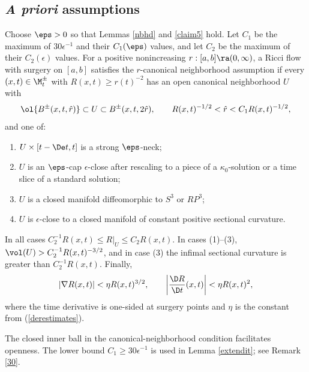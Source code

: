 \subsection{\emph{A priori} assumptions}

\begin{definition}
  \label{def:kl-priori-assumptions-canonical-neighborhood-assumption}
\label{canonicalnbhddef}
Choose $\eps>0$ so that Lemmas \ref{nbhd} and \ref{claim5} hold. Let
$C_1$ be the maximum of $30\epsilon^{-1}$ and their $C_1(\eps)$ values, and
let $C_2$ be the maximum of their $C_2(\epsilon)$ values. For a positive
nonincreasing $r:[a,b]\ra(0,\infty)$, a Ricci flow with surgery on $[a,b]$
satisfies the $r$-canonical neighborhood assumption if every
$(x,t)\in\M_t^\pm$ with $R(x,t)\geq r(t)^{-2}$ has an open canonical
neighborhood $U$ with
\[
\ol{B^\pm(x,t,\hat r)}\subset U\subset B^\pm(x,t,2\hat r),\qquad
R(x,t)^{-1/2}<\hat r<C_1R(x,t)^{-1/2},
\]
and one of:
\begin{enumerate}
\item $U\times[t-\De t,t]$ is a strong $\eps$-neck;
\item $U$ is an $\eps$-cap $\epsilon$-close after rescaling to a piece of a
$\kappa_0$-solution or a time slice of a standard solution;
\item $U$ is a closed manifold diffeomorphic to $S^3$ or $RP^3$;
\item $U$ is $\epsilon$-close to a closed manifold of constant positive
sectional curvature.
\end{enumerate}
In all cases $C_2^{-1}R(x,t)\leq R|_U\leq C_2R(x,t)$. In cases (1)--(3),
$\vol(U)>C_2^{-1}R(x,t)^{-3/2}$, and in case (3) the infimal sectional
curvature is greater than $C_2^{-1}R(x,t)$. Finally,
\begin{equation}
\label{II.(1.3)estimates}
|\nabla R(x,t)|<\eta R(x,t)^{3/2},\qquad
\left|\frac{\D R}{\D t}(x,t)\right|<\eta R(x,t)^2,
\end{equation}
where the time derivative is one-sided at surgery points and $\eta$ is the
constant from (\ref{derestimates}).
\end{definition}

\begin{remark}
  \label{rem:kl-priori-assumptions-continuation-canonical-neighborhoods}
The closed inner ball in the canonical-neighborhood condition facilitates
openness. The lower bound $C_1\geq30\epsilon^{-1}$ is used in Lemma
\ref{extendit}; see Remark \ref{30}.
\end{remark}

